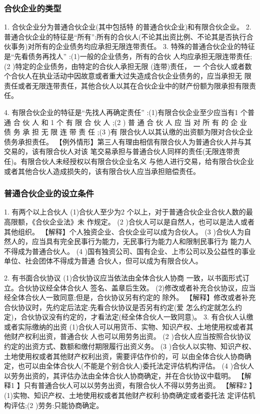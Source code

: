 \documentclass[UTF8,12pt]{ctexart}
\numberwithin{equation}{section} %
\numberwithin{figure}{section}
\numberwithin{table}{section}
\begin{document}
	\subsubsection{合伙企业的类型}
	1. 合伙企业分为普通合伙企业(其中包括特 的普通合伙企业)和有限合伙企业。
	2. 普通合伙企业的特征是“所有”:所有的合伙人(不论其出资比例、不论其是否执行合 伙事务)对所有的企业债务均应承担无限连带责任。
	3. 特殊的普通合伙企业的特征是“先看债务再找人” :(1)一般的企业债务，所有的合伙 人均应承担无限连带责任;(2 )特定的企业债务，由特定的合伙人承担无限 (连带)责任， 一 个合伙人或者数个合伙人在执业活动中因故意或者重大过失造成合伙企业债务的，应当承担无 限责任或者无限连带责任，其他合伙人以其在合伙企业中的财产份额为限承担有限责任。
	
	4. 有限合伙企业的特征是“先找人再确定责任” :(1)有限合伙企业至少应当有1 个普通 合 伙 人 和 1 个 有 限 合 伙 人 ;(2 ) 普 通 合 伙 人 应 当 对 所 有 的 企 业 债 务 承 担 无 限 连 带 责 任 ;(3 )有 限合伙人以其认缴的出资额为限对合伙企业债务承担责任。 【例外情形】第三人有理由相信有限合伙人为普通合伙人并与其交易的，该有限合伙人对该 笔交易承担与普通合伙人同样的责任(无限连带责任)。有限合伙人未经授权以有限合伙企业名义 与他人进行交易，给有限合伙企业或者其他合伙人造成损失的，该有限合伙人应当承担赔偿责任。
	
	\subsubsection{普通合伙企业的设立条件}
	1. 有两个以上合伙人
	(1)合伙人至少为2 个以上，对于普通合伙企业合伙人数的最高限额，《合伙企业法》未 作规定。
	(2 )合伙人可以是自然人，也可以是法人或者其他组织。
	【解释】个人独资企业、合伙企业可以成为合伙人。
	(3 )合伙人为自然人的，应当具有完全民事行为能力，无民事行为能力人和限制民事行为 能力人不得成为普通合伙人。
	(4 )国有独资公司、国有企业、上市公司以及公益性的事业单位、社会团体不得成为普通 合伙人，但可以成为有限合伙人。
	
	2. 有书面合伙协议
	(1)合伙协议应当依法由全体合伙人协商 一致，以书面形式订立。合伙协议经全体合伙人 签名、盖章后生效。 (2)修改或者补充合伙协议，应当经全体合伙人一致同意;但是，合伙协议另有约定的 除外。
	【解释】修改或者补充合伙协议时，先约定后法定:先看合伙协议是否另有约定(爱 怎么约定就怎么约定)，合伙协议没有约定的，才看法定(经全体合伙人一致同意)。
	3. 有合伙人认缴或者实际缴纳的出资 (1)合伙人可以用货币、实物、知识产权、土地使用权或者其他财产权利出资，普通合伙 人也可以用劳务出资。
	(2 )合伙人应当按照合伙协议约定的出资方式、数额和缴付期限履行出资义务。
	(3 )合伙人以实物、知识产权、土地使用权或者其他财产权利出资，需要评估作价的，可 以由全体合伙人协商确定，也可以由全体合伙人(不能是个别合伙人)委托法定评估机构评估。 (4 )合伙人以劳务出资的，其评估办法由全体合伙人协商确定，并在合伙协议中载明。
	【解释1 】只有普通合伙人可以以劳务出资，有限合伙人不得以劳务出资。
	【解释2 】(1)实物、知识产权、土地使用权或者其他财产权利:协商确定或者委托法 定评估机构评估;(2 )劳务:只能协商确定。
	
\end{document}
